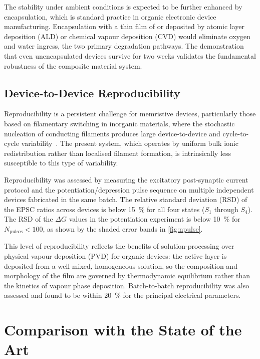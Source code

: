 \documentclass[12pt, a4paper, twoside]{report}
\newcommand{\EPSC}{excitatory post-synaptic current}
\begin{document}
The stability under ambient conditions is expected to be further enhanced by encapsulation, which is standard practice in organic electronic device manufacturing. Encapsulation with a thin film of  or  deposited by atomic layer deposition (ALD) or chemical vapour deposition (CVD) would eliminate oxygen and water ingress, the two primary degradation pathways. The demonstration that even unencapsulated devices survive for two weeks validates the fundamental robustness of the composite material system.

\subsection{Device-to-Device Reproducibility}\label{subsec:reproducibility}

Reproducibility is a persistent challenge for memristive devices, particularly those based on filamentary switching in inorganic materials, where the stochastic nucleation of conducting filaments produces large device-to-device and cycle-to-cycle variability~\cite{Sun2019}. The present system, which operates by uniform bulk ionic redistribution rather than localised filament formation, is intrinsically less susceptible to this type of variability.

Reproducibility was assessed by measuring the \EPSC{} protocol and the potentiation/depression pulse sequence on multiple independent devices fabricated in the same batch. The relative standard deviation (RSD) of the EPSC ratios across devices is below \SI{15}{\percent} for all four states ($S_1$ through $S_4$). The RSD of the $\Delta G$ values in the potentiation experiment is below \SI{10}{\percent} for $N_{\mathrm{pulses}} < 100$, as shown by the shaded error bands in \cref{fig:npulse}.

This level of reproducibility reflects the benefits of solution-processing over physical vapour deposition (PVD) for organic devices: the active layer is deposited from a well-mixed, homogeneous solution, so the composition and morphology of the film are governed by thermodynamic equilibrium rather than the kinetics of vapour phase deposition. Batch-to-batch reproducibility was also assessed and found to be within \SI{20}{\percent} for the principal electrical parameters.


\section{Comparison with the State of the Art}\label{sec:comparison}
\end{document}
